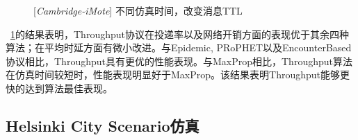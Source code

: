 \begin{figure}[tbp]
\caption{[\emph{Cambridge-iMote}] 不同仿真时间，改变消息TTL}
\label{fig:chap4_trace_ttl}
\end{figure}

\figurename~\ref{fig:chap4_trace_ttl}的结果表明，Throughput协议在投递率以及网络开销方面的表现优于其余四种算法；在平均时延方面有微小改进。与Epidemic, PRoPHET以及EncounterBased协议相比，Throughput具有更优的性能表现。与MaxProp相比，Throughput算法在仿真时间较短时，性能表现明显好于MaxProp。该结果表明Throughput能够更快的达到算法最佳表现。



\subsection{Helsinki City Scenario仿真}

